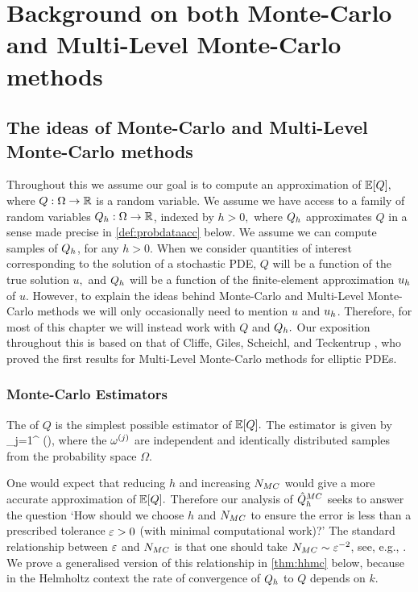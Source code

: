 \section[Background on MC and MLMC]{Background on both Monte-Carlo and Multi-Level Monte-Carlo   methods}\label{sec:overview}
\subsection{The ideas of Monte-Carlo and Multi-Level Monte-Carlo methods}\label{sec:mlmcideasoverview}
Throughout this  we assume our goal is to compute an approximation of $\EXP{Q},$ where $Q:\Omega\rightarrow\mathbb R$ is a random variable. We assume we have access to a family of random variables $Q_{h}:\Omega\rightarrow\mathbb R$, indexed by $h>0,$ where $Q_{h}$ approximates $Q$ in a sense made precise in \cref{def:probdataacc} below. We assume we can compute samples of $Q_{h}$, for any $h>0$. When we consider quantities of interest corresponding to the solution of a stochastic PDE, $Q$ will be a function of the true solution $u,$ and $Q_{h}$ will be a function of the finite-element approximation $u_{h}$ of $u.$ However, to explain the ideas behind Monte-Carlo and Multi-Level Monte-Carlo methods we will only occasionally need to mention $u$ and $u_{h}$. Therefore, for most of this chapter we will instead work with $Q$ and $Q_{h}.$ Our exposition throughout this  is based on that of Cliffe, Giles, Scheichl, and Teckentrup \cite{ClGiScTe:11}, who proved the first results for Multi-Level Monte-Carlo methods for elliptic PDEs.

\subsubsection{Monte-Carlo Estimators}

The  of $Q$ is the simplest possible estimator of $\EXP{Q}.$ The estimator is given by
\beqs
\QhatMC \de {} \sum_{j=1}^{\NMC} \Qh\mleft(\omegasj\mright),
\eeqs
where the $\omega^{(j)}$ are independent and identically distributed samples from the probability space $\Omega$.

One would expect that reducing $h$ and increasing $N_{MC}$ would give a more accurate approximation of $\EXP{Q}.$ Therefore our analysis of $\hat{Q}^{MC}_{h}$ seeks to answer the question `How should we choose $h$ and $N_{MC}$ to ensure the error is less than a prescribed tolerance $\varepsilon>0$ (with minimal computational work)?' The standard relationship between $\varepsilon$ and $N_{MC}$ is that one should take $N_{MC} \sim \varepsilon^{-2}$, see, e.g., \cite[Text after equation (3)]{ClGiScTe:11}. We prove a generalised version of this relationship in \cref{thm:hhmc} below, because in the Helmholtz context the rate of convergence of $Q_{h}$ to $Q$ depends on $k.$

